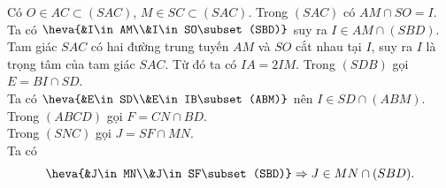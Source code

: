 \begin{ex}
{\begin{center}
		\end{center}
		\begin{itemchoice}
			\itemch Có $O\in AC \subset (SAC)$, $M\in SC \subset  (SAC)$. Trong $(SAC)$ có $AM\cap SO=I$.
			\itemch Ta có $\heva{&I\in AM\\&I\in SO\subset(SBD)}$ suy ra  $I\in AM\cap(SBD)$.\\
			Tam giác $SAC$ có  hai đường trung tuyến $AM$ và $SO$ cắt nhau tại $I$, suy ra $I$ là trọng tâm của tam giác $SAC$. Từ đó ta có $IA=2IM$.
			\itemch Trong $(SDB)$  gọi $E=BI\cap SD$.\\
			Ta có $\heva{&E\in SD\\&E\in IB\subset(ABM)}$ nên $I\in  SD\cap(ABM)$.
			\itemch Trong $(ABCD)$ gọi  $F=CN\cap BD$.\\
			Trong $(SNC)$ gọi $J=SF\cap  MN$.\\
			Ta có \[\heva{&J\in MN\\&J\in  SF\subset(SBD)}\Rightarrow J\in MN\cap(SBD).\]
		\end{itemchoice}
	} 
\end{ex}

